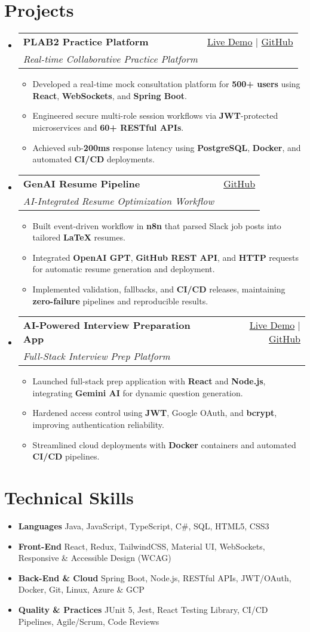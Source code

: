 \documentclass[letterpaper,11pt]{article}
\makeatletter
\newcommand{\resumeItem}[1]{\item\small{#1 \vspace{-2pt}}}
\newcommand{\resumeSubheading}[4]{
  \vspace{-1pt}\item
    \begin{tabular*}{0.97\textwidth}[t]{l@{\extracolsep{\fill}}r}
      \textbf{#1} & #2 \\
      \textit{\small#3} & \textit{\small #4} \\
    \end{tabular*}\vspace{-5pt}
}
\newcommand{\resumeSubHeadingListStart}{\begin{itemize}[leftmargin=*]}
\newcommand{\resumeSubHeadingListEnd}{\end{itemize}}
\newcommand{\resumeItemListStart}{\begin{itemize}}
\newcommand{\resumeItemListEnd}{\end{itemize}\vspace{-5pt}}
\makeatother
\begin{document}
\section{Projects}
  \resumeSubHeadingListStart
    \resumeSubheading
      {\textbf{PLAB2 Practice Platform}}{\href{https://plab2practice.com}{Live Demo} | \href{https://github.com/altansaid/plab2projectnew}{GitHub}}
      {Real-time Collaborative Practice Platform}{}
      \resumeItemListStart
        \resumeItem{Developed a real-time mock consultation platform for \textbf{500+ users} using \textbf{React}, \textbf{WebSockets}, and \textbf{Spring Boot}.}
        \resumeItem{Engineered secure multi-role session workflows via \textbf{JWT}-protected microservices and \textbf{60+ RESTful APIs}.}
        \resumeItem{Achieved sub-\textbf{200ms} response latency using \textbf{PostgreSQL}, \textbf{Docker}, and automated \textbf{CI/CD} deployments.}
      \resumeItemListEnd

    \resumeSubheading
      {\textbf{GenAI Resume Pipeline}}{\href{https://github.com/altansaid/resume-updates}{GitHub}}
      {AI-Integrated Resume Optimization Workflow}{}
      \resumeItemListStart
        \resumeItem{Built event-driven workflow in \textbf{n8n} that parsed Slack job posts into tailored \textbf{LaTeX} resumes.}
        \resumeItem{Integrated \textbf{OpenAI GPT}, \textbf{GitHub REST API}, and \textbf{HTTP} requests for automatic resume generation and deployment.}
        \resumeItem{Implemented validation, fallbacks, and \textbf{CI/CD} releases, maintaining \textbf{zero-failure} pipelines and reproducible results.}
      \resumeItemListEnd

    \resumeSubheading
      {\textbf{AI-Powered Interview Preparation App}}{\href{https://interviewcoach-ai.vercel.app}{Live Demo} | \href{https://github.com/altansaid/interviewcoach-ai}{GitHub}}
      {Full-Stack Interview Prep Platform}{}
      \resumeItemListStart
        \resumeItem{Launched full-stack prep application with \textbf{React} and \textbf{Node.js}, integrating \textbf{Gemini AI} for dynamic question generation.}
        \resumeItem{Hardened access control using \textbf{JWT}, Google OAuth, and \textbf{bcrypt}, improving authentication reliability.}
        \resumeItem{Streamlined cloud deployments with \textbf{Docker} containers and automated \textbf{CI/CD} pipelines.}
      \resumeItemListEnd
  \resumeSubHeadingListEnd

\section{Technical Skills}
  \resumeItemListStart
    \resumeItem{\textbf{Languages}}{Java, JavaScript, TypeScript, C\#, SQL, HTML5, CSS3}
    \resumeItem{\textbf{Front-End}}{React, Redux, TailwindCSS, Material UI, WebSockets, Responsive \& Accessible Design (WCAG)}
    \resumeItem{\textbf{Back-End \& Cloud}}{Spring Boot, Node.js, RESTful APIs, JWT/OAuth, Docker, Git, Linux, Azure \& GCP}
    \resumeItem{\textbf{Quality \& Practices}}{JUnit 5, Jest, React Testing Library, CI/CD Pipelines, Agile/Scrum, Code Reviews}
  \resumeItemListEnd

\end{document}
